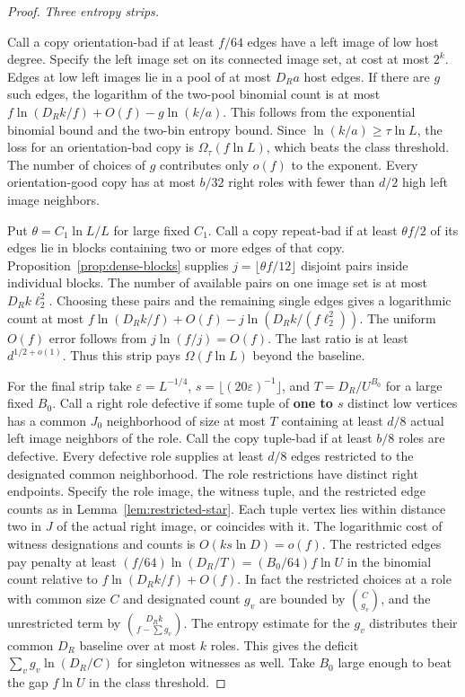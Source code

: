 \documentclass[11pt]{amsart}
\theoremstyle{definition}
\theoremstyle{remark}
\numberwithin{equation}{section}
\begin{document}
\begin{proof}
\medskip\noindent\emph{Three entropy strips.}

Call a copy orientation-bad if at least $f/64$ edges have a left image of low host degree. Specify the left image set on its connected image set, at cost at most $2^k $. Edges at low left images lie in a pool of at most $ D_R a $ host edges. If there are $ g $ such edges, the logarithm of the two-pool binomial count is at most $ f\ln(D_R k/f)+O(f)-g\ln(k/a)$. This follows from the exponential binomial bound and the two-bin entropy bound. Since $\ln(k/a)\ge\tau\ln L $, the loss for an orientation-bad copy is $\Omega_\tau(f\ln L)$, which beats the class threshold. The number of choices of $ g $ contributes only $ o(f)$ to the exponent. Every orientation-good copy has at most $ b/32$ right roles with fewer than $ d/2$ high left image neighbors.

Put $\theta=C_1\ln L/L $ for large fixed $ C_1$. Call a copy repeat-bad if at least $\theta f/2$ of its edges lie in blocks containing two or more edges of that copy. Proposition~\ref{prop:dense-blocks} supplies $ j=\lfloor\theta f/12\rfloor $ disjoint pairs inside individual blocks. The number of available pairs on one image set is at most $ D_R k\ell_2^2$. Choosing these pairs and the remaining single edges gives a logarithmic count at most $ f\ln(D_Rk/f)+O(f)-j\ln(D_R k/(f\ell_2^2))$. The uniform $ O(f)$ error follows from $ j\ln(f/j)=O(f)$. The last ratio is at least $ d^{1/2+o(1)}$. Thus this strip pays $\Omega(f\ln L)$ beyond the baseline.

For the final strip take $\varepsilon=L^{-1/4}$, $ s=\lfloor(20\varepsilon)^{-1}\rfloor $, and $ T=D_R/U^{B_0}$ for a large fixed $ B_0$. Call a right role defective if some tuple of \textbf{one to $ s $} distinct low vertices has a common $ J_0$ neighborhood of size at most $ T $ containing at least $ d/8$ actual left image neighbors of the role. Call the copy tuple-bad if at least $ b/8$ roles are defective. Every defective role supplies at least $ d/8$ edges restricted to the designated common neighborhood. The role restrictions have distinct right endpoints. Specify the role image, the witness tuple, and the restricted edge counts as in Lemma~\ref{lem:restricted-star}. Each tuple vertex lies within distance two in $ J $ of the actual right image, or coincides with it. The logarithmic cost of witness designations and counts is $ O(ks\ln D)=o(f)$. The restricted edges pay penalty at least $(f/64)\ln(D_R/T)=(B_0/64)f\ln U $ in the binomial count relative to $ f\ln(D_Rk/f)+O(f)$. In fact the restricted choices at a role with common size $ C $ and designated count $ g_v $ are bounded by $\binom C{g_v}$, and the unrestricted term by $\binom{D_R k}{f-\sum g_v}$. The entropy estimate for the $ g_v $ distributes their common $ D_R $ baseline over at most $ k $ roles. This gives the deficit $\sum_v g_v\ln(D_R/C)$ for singleton witnesses as well. Take $ B_0$ large enough to beat the gap $ f\ln U$ in the class threshold.


\end{proof}
\end{document}
